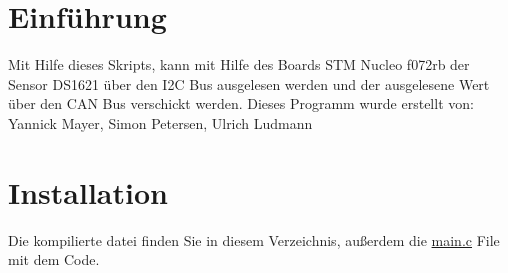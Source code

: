 \hypertarget{index_intro_sec}{}\section{Einführung}\label{index_intro_sec}
Mit Hilfe dieses Skripts, kann mit Hilfe des Boards S\+TM Nucleo f072rb der Sensor D\+S1621 über den I2C Bus ausgelesen werden und der ausgelesene Wert über den C\+AN Bus verschickt werden. Dieses Programm wurde erstellt von\+: Yannick Mayer, Simon Petersen, Ulrich Ludmann \hypertarget{index_install_sec}{}\section{Installation}\label{index_install_sec}
Die kompilierte datei finden Sie in diesem Verzeichnis, außerdem die \hyperlink{main_8c}{main.\+c} File mit dem Code. 